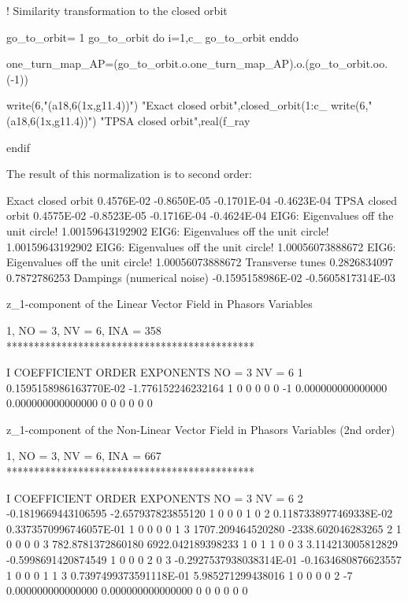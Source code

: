 \documentclass{hitec}     %
\begin{document}
{{\begin{code}
! Similarity transformation to the closed orbit
 
go_to_orbit= 1
go_to_orbit%
do i=1,c_%
 go_to_orbit%
enddo
 
one_turn_map_AP=(go_to_orbit.o.one_turn_map_AP).o.(go_to_orbit.oo.(-1))

 write(6,"(a18,6(1x,g11.4))") "Exact closed orbit",closed_orbit(1:c_%
 write(6,"(a18,6(1x,g11.4))") "TPSA  closed orbit",real(f_ray%

endif
 
\end{code}

The result of this normalization  is to second order:
 
\begin{code}
Exact closed orbit  0.4576E-02 -0.8650E-05 -0.1701E-04 -0.4623E-04
TPSA  closed orbit  0.4575E-02 -0.8523E-05 -0.1716E-04 -0.4624E-04
  EIG6: Eigenvalues off the unit circle!
   1.00159643192902
  EIG6: Eigenvalues off the unit circle!
   1.00159643192902
  EIG6: Eigenvalues off the unit circle!
   1.00056073888672
  EIG6: Eigenvalues off the unit circle!
   1.00056073888672
 Transverse tunes
  0.2826834097       0.7872786253
 Dampings (numerical noise)
 -0.1595158986E-02  -0.5605817314E-03

 z_1-component of the Linear Vector Field in Phasors Variables

          1, NO =    3, NV =    6, INA =  358
 *********************************************

    I  COEFFICIENT          ORDER   EXPONENTS
      NO =     3      NV =     6
   1  0.1595158986163770E-02  -1.776152246232164       1  0  0  0  0  0
    -1   0.000000000000000       0.000000000000000       0  0  0  0  0  0

 z_1-component of the Non-Linear Vector Field in Phasors Variables (2nd order)

          1, NO =    3, NV =    6, INA =  667
 *********************************************

    I  COEFFICIENT          ORDER   EXPONENTS
      NO =     3      NV =     6
   2 -0.1819669443106595      -2.657937823855120       1  0  0  0  1  0
   2  0.1187338977469338E-02  0.3373570996746057E-01   1  0  0  0  0  1
   3   1707.209464520280      -2338.602046283265       2  1  0  0  0  0
   3   782.8781372860180       6922.042189398233       1  0  1  1  0  0
   3   3.114213005812829     -0.5998691420874549       1  0  0  0  2  0
   3 -0.2927537938038314E-01 -0.1634680876623557       1  0  0  0  1  1
   3  0.7397499373591118E-01   5.985271299438016       1  0  0  0  0  2
    -7   0.000000000000000       0.000000000000000       0  0  0  0  0  0
\end{code}

}}
\end{document}
